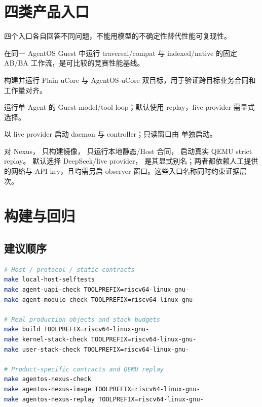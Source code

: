 \section{四类产品入口}

四个入口各自回答不同问题，不能用模型的不确定性替代性能可复现性。

\begin{description}[leftmargin=3.1cm,style=nextline]
  \item[\code{make contest-demo}] 在同一 AgentOS Guest 中运行 traversal/compat 与 indexed/native 的固定 AB/BA 工作流，是可比较的竞赛性能基线。
  \item[\code{make dual-platform-run}] 构建并运行 Plain uCore 与 AgentOS-uCore 双目标，用于验证跨目标业务合同和工作量对齐。
  \item[\code{make agent-live-demo}] 运行单 Agent 的 Guest model/tool loop；默认使用 replay，live provider 需显式选择。
  \item[\code{make agentos-nexus}] 以 live provider 启动 daemon 与 controller；只读窗口由  单独启动。
\end{description}

对 Nexus， 只构建镜像， 只运行本地静态/Host 合同， 启动真实 QEMU strict replay。 默认选择 DeepSeek/live provider， 是其显式别名；两者都依赖人工提供的网络与 API key，且均需另启 observer 窗口。这些入口名称同时约束证据层次。

\section{构建与回归}

\subsection{建议顺序}

\begin{lstlisting}[language=bash,caption={从快速合同到 QEMU 产品的分层验证}]
# Host / protocol / static contracts
make local-host-selftests
make agent-uapi-check TOOLPREFIX=riscv64-linux-gnu-
make agent-module-check TOOLPREFIX=riscv64-linux-gnu-

# Real production objects and stack budgets
make build TOOLPREFIX=riscv64-linux-gnu-
make kernel-stack-check TOOLPREFIX=riscv64-linux-gnu-
make user-stack-check TOOLPREFIX=riscv64-linux-gnu-

# Product-specific contracts and QEMU replay
make agentos-nexus-check
make agentos-nexus-image TOOLPREFIX=riscv64-linux-gnu-
make agentos-nexus-replay TOOLPREFIX=riscv64-linux-gnu-
\end{lstlisting}

